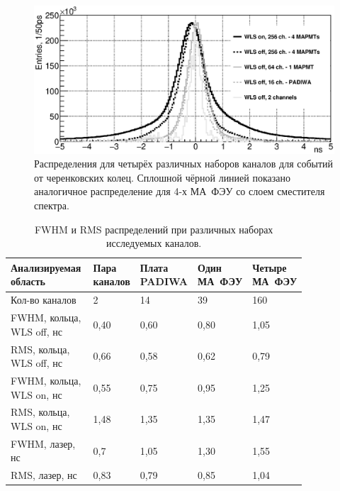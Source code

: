 \begin{figure}[H]
\centering
\includegraphics[width=1.0\textwidth]{pictures/Time_precision_evolution_rings_6_bw_noMirror_20Mar2017.eps}
\caption{Распределения для четырёх различных наборов каналов для событий от черенковских колец. Сплошной чёрной линией показано аналогичное распределение для 4-х МА~ФЭУ со слоем сместителя спектра.}
\label{fig:TimeResEvolutionRings}
\end{figure}



\begin{table}[H]
\caption{FWHM и RMS распределений при различных наборах исследуемых каналов.}
\label{tabl:EvolutionParams}
\begin{tabular}{ | p{0.30\linewidth} | p{0.12\linewidth} | p{0.13\linewidth} | p{0.13\linewidth} | p{0.15\linewidth} | }
	\hline
	\scriptsize{Анализируемая область} & \scriptsize{Пара каналов} & \scriptsize{Плата PADIWA} & \scriptsize{Один МА~ФЭУ} & \scriptsize{Четыре МА~ФЭУ} \\
	\hline \hline
	\scriptsize{Кол-во каналов} & 2 & 14 & 39 & 160 \\
	\hline
	\scriptsize{FWHM, кольца, WLS off, нс} & 0,40 & 0,60 & 0,80 & 1,05 \\
	\hline
	\scriptsize{RMS, кольца, WLS off, нс} & 0,66 & 0,58 & 0,62 & 0,79 \\
	\hline
	\scriptsize{FWHM, кольца, WLS on, нс} & 0,55 & 0,75 & 0,95 & 1,25 \\
	\hline
	\scriptsize{RMS, кольца, WLS on, нс} & 1,48 & 1,35 & 1,35 & 1,47 \\
	\hline \hline
	\scriptsize{FWHM, лазер, нс} & 0,7 & 1,05 & 1,30 & 1,55 \\
	\hline
	\scriptsize{RMS, лазер, нс} & 0,83 & 0,79 & 0,85 & 1,04 \\
	\hline
\end{tabular}
\end{table}
